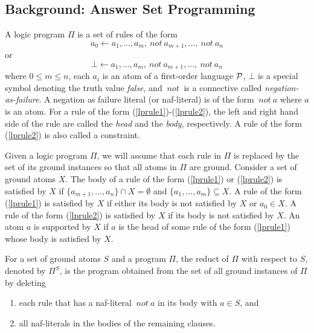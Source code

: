 \documentclass{article}
\def\naf{\: {not} \:}
\begin{document}
 
\subsection{Background: Answer Set Programming}

A logic program $\Pi$ is a set of rules of the form
%
\begin{equation}
\label{lprule1}
 a_0 \leftarrow a_1,\ldots,a_m,\naf a_{m+1},\ldots,\naf a_n
\end{equation}
%
or
%
\begin{equation}
\label{lprule2}
 \bot \leftarrow a_1,\ldots,a_m,\naf a_{m+1},\ldots,\naf a_n
\end{equation}
%
where $0 \le m \le n$, each $a_i$ is an atom of a first-order
language $\cal P$, $\bot$ is a special symbol denoting the
truth value \emph{false}, and $\naf$ is a connective called {\em
negation-as-failure}. A negation as failure literal (or
naf-literal) is of the form $\naf a$ where $a$ is an atom. For a
rule of the form (\ref{lprule1})-(\ref{lprule2}), the left and
right hand side of the rule are called the \emph{head} and the
\emph{body}, respectively. A rule of the form (\ref{lprule2}) is
also called a constraint.

Given a logic program $\Pi$, we will assume that each rule in
$\Pi$ is replaced by the set of its ground instances so that all
atoms in $\Pi$ are ground. Consider a set of ground atoms $X$. The
body of a rule of the form (\ref{lprule1}) or (\ref{lprule2}) is
satisfied by $X$ if $\{a_{m+1},\ldots,a_n\} \cap X = \emptyset$
and $\{a_{1},\ldots,a_m\} \subseteq X$. A rule of the form
(\ref{lprule1}) is satisfied by $X$ if either its body is not
satisfied by $X$ or $a_0 \in X$. A rule of the form
(\ref{lprule2}) is satisfied by $X$ if its body is not satisfied
by $X$. An atom $a$ is supported by $X$ if $a$ is the head of some
rule of the form (\ref{lprule1}) whose body is satisfied by $X$.

For a set of ground atoms $S$ and a program $\Pi$, the reduct
of $\Pi$ with respect to $S$, denoted by $\Pi^S$, is the program
obtained from the set of all ground instances of $\Pi$ by deleting

\begin{enumerate}
\item each rule that has a naf-literal $\naf a$ in its body with
$a \in S$, and

\item all naf-literals in the bodies of the remaining clauses.
\end{enumerate}
\end{document}
